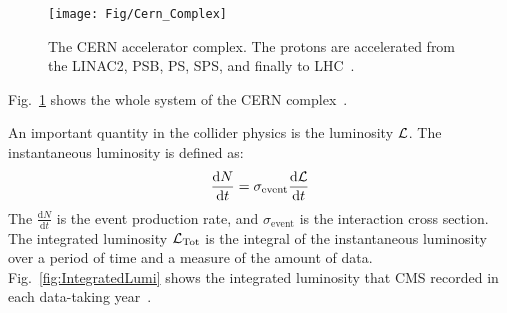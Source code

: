 \begin{figure}[!ht]
  \begin{center}
    \texttt{[image: Fig/Cern\_Complex]}\\
    \caption{The CERN accelerator complex. The protons are accelerated from the LINAC2, PSB, PS, SPS, and finally to LHC~\cite{Mobs:2197559}.}
    \label{fig:cerncomp}
  \end{center}
\end{figure}

Fig.~\ref{fig:cerncomp} shows the whole system of the CERN complex~\cite{Mobs:2197559}. 

An important quantity in the collider physics is the luminosity $\mathcal{L}$. The instantaneous luminosity is defined as:
\begin{equation}
	\frac{\mathrm d N}{\mathrm d t}=\sigma_{\text{event}}\frac{\mathrm d \mathcal{L}}{\mathrm d t}
\end{equation}
The $\frac{\mathrm d N}{\mathrm d t}$ is the event production rate, and $\sigma_{\text{event}}$ is the interaction cross section.
The integrated luminosity $\mathcal{L}_{\text{Tot}}$ is the integral of the instantaneous luminosity over a period of time and a measure of the amount of data. Fig.~\ref{fig:IntegratedLumi} shows the integrated luminosity that CMS recorded in each data-taking year~\cite{CMSLUMI}. 

